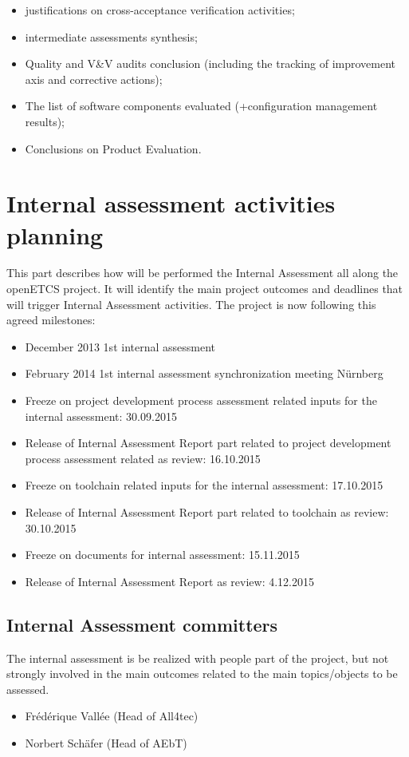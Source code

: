 \documentclass{template/openetcs_article}
\begin{document}
\begin{itemize}
\item justifications on cross-acceptance verification activities;
\item intermediate assessments synthesis;
\item Quality and V\&V audits conclusion (including the tracking of improvement axis and corrective actions);
\item The list of software components evaluated (+configuration management results);
\item Conclusions on Product Evaluation.
\end{itemize}

\section{Internal assessment activities planning}
This part describes how will be performed the Internal Assessment all along the openETCS project. It will identify the main project outcomes and deadlines that will trigger Internal Assessment activities. The project is now following this agreed milestones:

\begin{itemize}
\item December 2013 1st internal assessment
\item February 2014 1st internal assessment synchronization meeting N\"urnberg
\item Freeze on project development process assessment related inputs for the internal assessment: 30.09.2015
\item Release of Internal Assessment Report part related to project development process assessment related as review: 16.10.2015
\item Freeze on toolchain related inputs for the internal assessment: 17.10.2015
\item Release of Internal Assessment Report part related to toolchain as review: 30.10.2015
\item Freeze on documents for internal assessment: 15.11.2015
\item Release of Internal Assessment Report as review: 4.12.2015
\end{itemize}

\subsection{Internal Assessment committers}
The internal assessment is be realized with people part of the project, but not strongly involved in the main outcomes related to the main topics/objects to be assessed.
\begin{itemize}
\item Fr\'ed\'erique Vall\'ee (Head of All4tec)
\item Norbert Sch\"afer (Head of AEbT)
\end{itemize}
\end{document}
